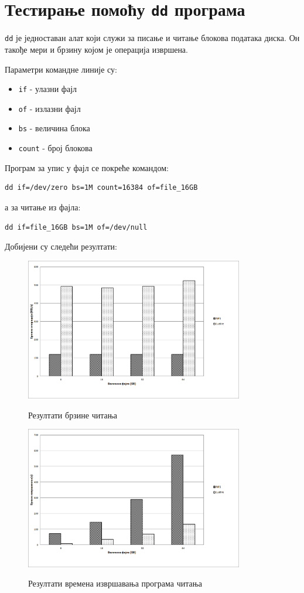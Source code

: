 \section{Тестирање помоћу \texttt{dd} програма }

\texttt{dd} је једноставан алат који служи за писање и читање блокова података диска. Он такође мери и брзину којом је операција извршена.

Параметри командне линије су:

\begin{itemize}
\item \texttt{if} - улазни фајл
\item \texttt{of} - излазни фајл
\item \texttt{bs} - величина блока
\item \texttt{count} - број блокова
\end{itemize}
Програм за упис у фајл  се покреће командом:
\begin{verbatim}
dd if=/dev/zero bs=1M count=16384 of=file_16GB
\end{verbatim}
а за читање из фајла:
\begin{verbatim}
dd if=file_16GB bs=1M of=/dev/null
\end{verbatim}
Добијени су следећи резултати:
\begin{figure}[H]
   \centering
       \includegraphics[width=0.85\textwidth]{slike/results/dd_read_speed.png}\\[1cm]
   \caption{Резултати брзине читања}
\end{figure} 
\begin{figure}[H]
    \centering
        \includegraphics[width=0.85\textwidth]{slike/results/dd_read_time.png}\\[1cm]
    \caption{Резултати времена извршавања програма читања}
\end{figure}  
